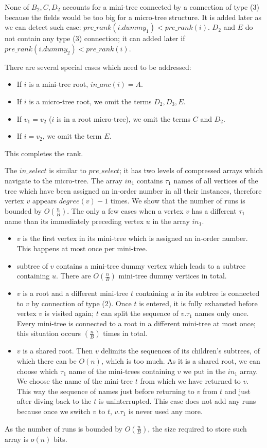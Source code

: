 None of $B_2, C, D_2$ accounts for a mini-tree connected by a connection of type (3) because the fields would be too big for a micro-tree structure.
It is added later as we can detect such case: $pre\_rank(i.dummy_1) < pre\_rank(i)$.
$D_2$ and $E$ do not contain any type (3) connection; it can added later if $pre\_rank(i.dummy_2) < pre\_rank(i)$.

There are several special cases which need to be addressed:
\begin{itemize}
	\item If $i$ is a mini-tree root, $in\_anc(i) = A$.
	\item If $i$ is a micro-tree root, we omit the terms $D_2, D_3, E$.
	\item If $v_1 = v_2$ ($i$ is in a root micro-tree), we omit the terms $C$ and $D_2$.
	\item If $i = v_2$, we omit the term $E$.
\end{itemize}

This completes the rank.

The $in\_select$ is similar to $pre\_select$; it has two levels of compressed arrays which navigate to the micro-tree.
The array $in_1$ contains $\tau_1$ names of all vertices of the tree which have been assigned an in-order number in all their instances, therefore vertex $v$ appears $degree(v) - 1$ times.
We show that the number of runs is bounded by $O(\frac{n}{B})$.
The only a few cases when a vertex $v$ has a different $\tau_1$ name than its immediately preceding vertex $u$ in the array $in_1$.
\begin{itemize}
	\item $v$ is the first vertex in its mini-tree which is assigned an in-order number.
	This happens at most once per mini-tree.
	\item subtree of $v$ contains a mini-tree dummy vertex which leads to a subtree containing $u$.
	There are $O(\frac{n}{B})$ mini-tree dummy vertices in total.
	\item $v$ is a root and a different mini-tree $t$ containing $u$ in its subtree is connected to $v$ by connection of type (2).
	Once $t$ is entered, it is fully exhausted before vertex $v$ is visited again; $t$ can split the sequence of $v.\tau_1$ names only once.
	Every mini-tree is connected to a root in a different mini-tree at most once; this situation occurs $(\frac{n}{B})$ times in total.
	\item $v$ is a shared root.
	Then $v$ delimits the sequences of its children's subtrees, of which there can be $O(n)$, which is too much.
	As it is a shared root, we can choose which $\tau_1$ name of the mini-trees containing $v$ we put in the $in_1$ array.
	We choose the name of the mini-tree $t$ from which we have returned to $v$.
	This way the sequence of names just before returning to $v$ from $t$ and just after diving back to the $t$ is uninterrupted.
	This case does not add any runs because once we switch $v$ to $t$, $v.\tau_1$ is never used any more.
\end{itemize}
As the number of runs is bounded by $O(\frac{n}{B})$, the size required to store such array is $o(n)$ bits.

